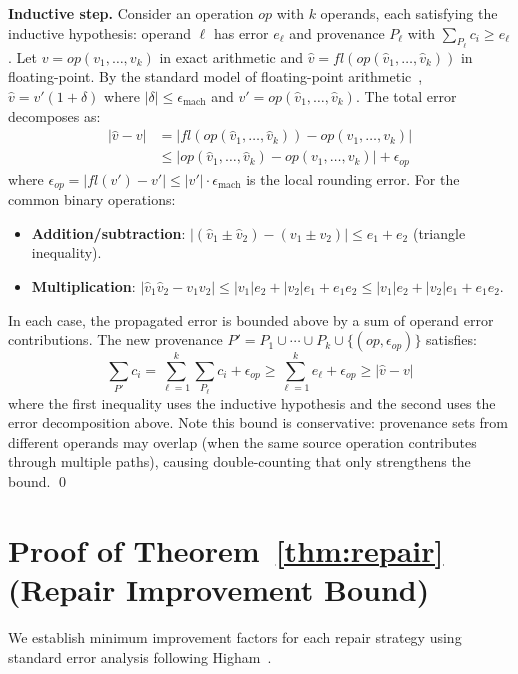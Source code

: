 \documentclass[11pt]{article}
\begin{document}
\textbf{Inductive step.} Consider an operation $op$ with $k$ operands, each satisfying the inductive hypothesis: operand $\ell$ has error $e_\ell$ and provenance $P_\ell$ with $\sum_{P_\ell} c_i \geq e_\ell$. Let $v = op(v_1, \ldots, v_k)$ in exact arithmetic and $\hat{v} = fl(op(\hat{v}_1, \ldots, \hat{v}_k))$ in floating-point. By the standard model of floating-point arithmetic~\cite{higham}, $\hat{v} = v'(1 + \delta)$ where $|\delta| \leq \epsilon_{\text{mach}}$ and $v' = op(\hat{v}_1, \ldots, \hat{v}_k)$. The total error decomposes as:
\begin{align*}
|\hat{v} - v| &= |fl(op(\hat{v}_1, \ldots, \hat{v}_k)) - op(v_1, \ldots, v_k)| \\
              &\leq |op(\hat{v}_1, \ldots, \hat{v}_k) - op(v_1, \ldots, v_k)| + \epsilon_{op}
\end{align*}
where $\epsilon_{op} = |fl(v') - v'| \leq |v'| \cdot \epsilon_{\text{mach}}$ is the local rounding error. For the common binary operations:
\begin{itemize}
  \item \textbf{Addition/subtraction}: $|(\hat{v}_1 \pm \hat{v}_2) - (v_1 \pm v_2)| \leq e_1 + e_2$ (triangle inequality).
  \item \textbf{Multiplication}: $|\hat{v}_1 \hat{v}_2 - v_1 v_2| \leq |v_1| e_2 + |v_2| e_1 + e_1 e_2 \leq |v_1| e_2 + |v_2| e_1 + e_1 e_2$.
\end{itemize}
In each case, the propagated error is bounded above by a sum of operand error contributions. The new provenance $P' = P_1 \cup \cdots \cup P_k \cup \{(op, \epsilon_{op})\}$ satisfies:
$$\sum_{P'} c_i = \sum_{\ell=1}^{k} \sum_{P_\ell} c_i + \epsilon_{op} \geq \sum_{\ell=1}^{k} e_\ell + \epsilon_{op} \geq |\hat{v} - v|$$
where the first inequality uses the inductive hypothesis and the second uses the error decomposition above. Note this bound is conservative: provenance sets from different operands may overlap (when the same source operation contributes through multiple paths), causing double-counting that only strengthens the bound. \qed

\section{Proof of Theorem~\ref{thm:repair} (Repair Improvement Bound)}

We establish minimum improvement factors for each repair strategy using standard error analysis following Higham~\cite{higham}.
\end{document}
